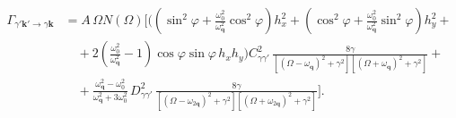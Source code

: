 \documentclass[a4paper,10pt]{article}
\begin{document}
\begin{tcolorbox}
\begin{align}
\Gamma_{\gamma'\mathbf{k}'\to\gamma\mathbf{k}}
&= A\,\Omega N(\Omega)\Bigg[
\Bigg(\left(\sin^2\varphi + \frac{\omega_0^2}{\omega_{\mathbf{q}}^2}\cos^2\varphi\right) h_x^2
+ \left(\cos^2\varphi + \frac{\omega_0^2}{\omega_{\mathbf{q}}^2}\sin^2\varphi\right) h_y^2 + \nonumber\\
&\quad + 2\left(\frac{\omega_0^2}{\omega_{\mathbf{q}}^2} - 1\right)\cos\varphi\sin\varphi\, h_x h_y\Bigg)
C_{\gamma\gamma'}^2\,
\frac{8\gamma}{\left[(\Omega-\omega_{\mathbf{q}})^2+\gamma^2\right]\left[(\Omega+\omega_{\mathbf{q}})^2+\gamma^2\right]} + \nonumber\\
&\quad + \frac{\omega_{\mathbf{q}}^2-\omega_0^2}{\omega_{\mathbf{q}}^2+3\omega_0^2}\, D_{\gamma\gamma'}^2\,
\frac{8\gamma}{\left[(\Omega-\omega_{2\mathbf{q}})^2+\gamma^2\right]\left[(\Omega+\omega_{2\mathbf{q}})^2+\gamma^2\right]}
\Bigg].
\end{align}
\end{tcolorbox}
\end{document}

